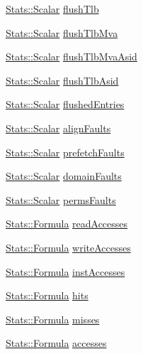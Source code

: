 \begin{DoxyCompactItemize}
\item 
\hyperlink{classStats_1_1Scalar}{Stats::Scalar} \hyperlink{classArmISA_1_1TLB_a14429a278d32a87d27c0d9df47269a12}{flushTlb}
\item 
\hyperlink{classStats_1_1Scalar}{Stats::Scalar} \hyperlink{classArmISA_1_1TLB_af504265daaa5a177333d30804fba83a8}{flushTlbMva}
\item 
\hyperlink{classStats_1_1Scalar}{Stats::Scalar} \hyperlink{classArmISA_1_1TLB_a94bc002df9a21796ac29c74bc3ef8240}{flushTlbMvaAsid}
\item 
\hyperlink{classStats_1_1Scalar}{Stats::Scalar} \hyperlink{classArmISA_1_1TLB_a678e74ffba8318815627ae109f96b17e}{flushTlbAsid}
\item 
\hyperlink{classStats_1_1Scalar}{Stats::Scalar} \hyperlink{classArmISA_1_1TLB_ad4c80b0aa999ae0403e2ffbc9a217aaa}{flushedEntries}
\item 
\hyperlink{classStats_1_1Scalar}{Stats::Scalar} \hyperlink{classArmISA_1_1TLB_aaafbdf0bc49ea504814d314b5f51d47e}{alignFaults}
\item 
\hyperlink{classStats_1_1Scalar}{Stats::Scalar} \hyperlink{classArmISA_1_1TLB_a8d76399ea2182eaf505e54da078f5202}{prefetchFaults}
\item 
\hyperlink{classStats_1_1Scalar}{Stats::Scalar} \hyperlink{classArmISA_1_1TLB_a718b0dd709705b2b6cbf1c5e33c387fd}{domainFaults}
\item 
\hyperlink{classStats_1_1Scalar}{Stats::Scalar} \hyperlink{classArmISA_1_1TLB_a95307396029ef99d258ca5284cd8b284}{permsFaults}
\item 
\hyperlink{classStats_1_1Formula}{Stats::Formula} \hyperlink{classArmISA_1_1TLB_a1ebd2c58048a00cc55442a58e6782f35}{readAccesses}
\item 
\hyperlink{classStats_1_1Formula}{Stats::Formula} \hyperlink{classArmISA_1_1TLB_aaf48f6b8c76d54c75a6156c32ac6405f}{writeAccesses}
\item 
\hyperlink{classStats_1_1Formula}{Stats::Formula} \hyperlink{classArmISA_1_1TLB_a7268909f031909e2eab6994aa6406ae4}{instAccesses}
\item 
\hyperlink{classStats_1_1Formula}{Stats::Formula} \hyperlink{classArmISA_1_1TLB_a224eed77bfb7a27359c9c3c1acbdbfaa}{hits}
\item 
\hyperlink{classStats_1_1Formula}{Stats::Formula} \hyperlink{classArmISA_1_1TLB_a4b8b96257f1e97cd5730673f38f9571c}{misses}
\item 
\hyperlink{classStats_1_1Formula}{Stats::Formula} \hyperlink{classArmISA_1_1TLB_a1929e1032289676f78e07e4c6bc55369}{accesses}

\end{DoxyCompactItemize}
